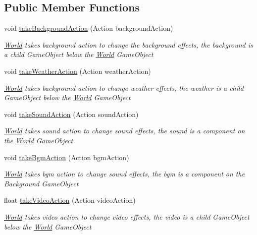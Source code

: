 \subsection*{Public Member Functions}
\begin{DoxyCompactItemize}
\item 
void \hyperlink{class_world_ab49162762b62c4f38a8f0a1757c881e0}{take\+Background\+Action} (Action background\+Action)
\begin{DoxyCompactList}\small\item\em \hyperlink{class_world}{World} takes background action to change the background effects, the background is a child Game\+Object below the \hyperlink{class_world}{World} Game\+Object \end{DoxyCompactList}\item 
void \hyperlink{class_world_ad903e6d33c16edb01e13c8dc1ba18c9c}{take\+Weather\+Action} (Action weather\+Action)
\begin{DoxyCompactList}\small\item\em \hyperlink{class_world}{World} takes background action to change weather effects, the weather is a child Game\+Object below the \hyperlink{class_world}{World} Game\+Object \end{DoxyCompactList}\item 
void \hyperlink{class_world_ab892dedd08be3002e75cd2ca8785bb81}{take\+Sound\+Action} (Action sound\+Action)
\begin{DoxyCompactList}\small\item\em \hyperlink{class_world}{World} takes sound action to change sound effects, the sound is a component on the \hyperlink{class_world}{World} Game\+Object \end{DoxyCompactList}\item 
void \hyperlink{class_world_af4349abca56d6e66009aff1cdf59c387}{take\+Bgm\+Action} (Action bgm\+Action)
\begin{DoxyCompactList}\small\item\em \hyperlink{class_world}{World} takes bgm action to change sound effects, the bgm is a component on the Background Game\+Object \end{DoxyCompactList}\item 
float \hyperlink{class_world_a23bd10af7aa6fd7d54d71a8fa73fc71a}{take\+Video\+Action} (Action video\+Action)
\begin{DoxyCompactList}\small\item\em \hyperlink{class_world}{World} takes video action to change video effects, the video is a child Game\+Object below the \hyperlink{class_world}{World} Game\+Object \end{DoxyCompactList}\item 

\end{DoxyCompactItemize}
